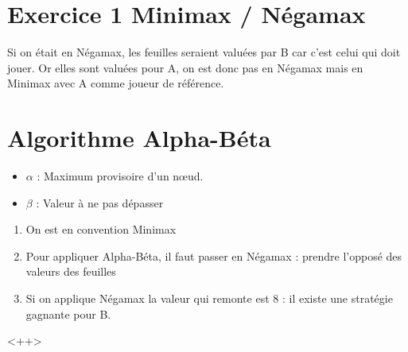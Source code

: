 \documentclass[12pt,a4paper,openany]{book}
\begin{document}
	\section{Exercice 1 Minimax / Négamax}
	Si on était en Négamax, les feuilles seraient valuées par B car c'est celui qui doit jouer. Or elles sont valuées pour A, on est donc pas en
	Négamax mais en Minimax avec A comme joueur de référence.
	
	\section{Algorithme Alpha-Béta}
\begin{itemize}
	\item $\alpha$ : Maximum provisoire d'un nœud.
	\item $\beta$ : Valeur à ne pas dépasser
\end{itemize}

\begin{enumerate}
	\item On est en convention Minimax
	\item Pour appliquer Alpha-Béta, il faut passer en Négamax : prendre l'opposé des valeurs des feuilles
	\item Si on applique Négamax la valeur qui remonte est 8 : il existe une stratégie gagnante pour B.
\end{enumerate}<++>

	\appendix
	\lstlistoflistings
\end{document}
